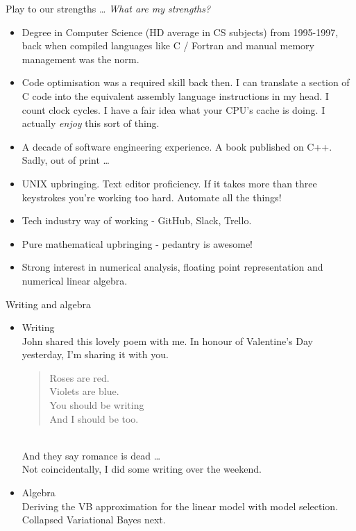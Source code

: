 \documentclass{beamer}
\begin{document}
\begin{frame}{Play to our strengths \ldots}
\emph{What are my strengths?}
\begin{itemize}
\item Degree in Computer Science (HD average in CS subjects) from 1995-1997, back when compiled languages 
			like C / Fortran and manual memory management was the norm.
\item Code optimisation was a required skill back then. I can translate a section of C code into the
			equivalent assembly language instructions in my head. I count clock cycles. I have a fair idea what your
			CPU's cache is doing. I actually \emph{enjoy} this sort of thing.
\item A decade of software engineering experience. A book published on C++. Sadly, out of print \ldots
\item UNIX upbringing. Text editor proficiency. If it takes more than three keystrokes you're working too 					hard. Automate all the things!
\item Tech industry way of working - GitHub, Slack, Trello.
\item Pure mathematical upbringing - pedantry is awesome!
\item Strong interest in numerical analysis, floating point representation and numerical linear algebra.
\end{itemize}
\end{frame}

\begin{frame}{Writing and algebra}
\begin{itemize}
\item Writing \\
John shared this lovely poem with me. In honour of Valentine's Day yesterday, I'm sharing it with you.
\begin{quote}
Roses are red. \\
Violets are blue. \\
You should be writing \\
And I should be too. \\
\end{quote} \\
And they say romance is dead \ldots \\
Not coincidentally, I did some writing over the weekend. \\
\item Algebra \\
Deriving the VB approximation for the linear model with model selection. \\
Collapsed Variational Bayes next.
\end{itemize}
\end{frame}
\end{document}
